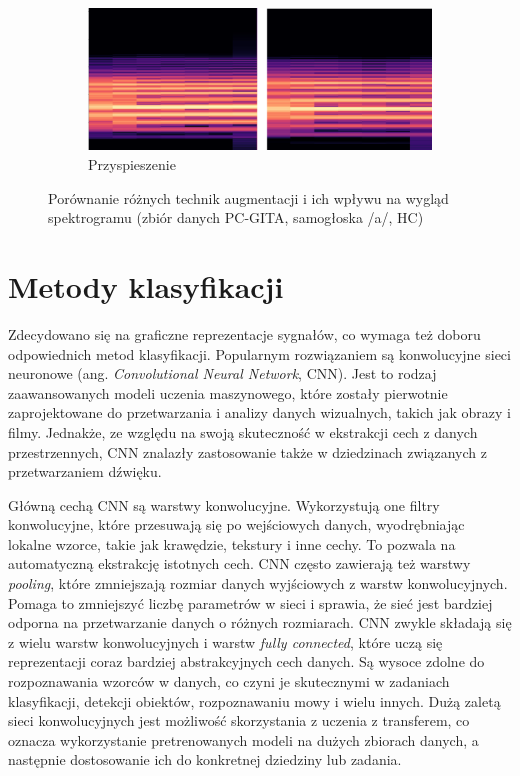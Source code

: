 \begin{figure}[ht]
    \begin{subfigure}{0.7\textwidth}
        \includegraphics[width=\linewidth]{./img/augmentation/speed}
        \caption{Przyspieszenie\@}
        \label{fig:speed}
    \end{subfigure}

    \caption{Porównanie różnych technik augmentacji i ich wpływu na wygląd spektrogramu (zbiór danych PC-GITA, samogłoska /a/, HC)}
    \label{fig:augumentacja}
\end{figure}

\section{Metody klasyfikacji}
\label{sec:klasyfikacja}

Zdecydowano się na graficzne reprezentacje sygnałów, co wymaga też doboru odpowiednich metod klasyfikacji.
Popularnym rozwiązaniem są konwolucyjne sieci neuronowe (ang. \emph{Convolutional Neural Network}, CNN).
Jest to rodzaj zaawansowanych modeli uczenia maszynowego, które zostały pierwotnie zaprojektowane do przetwarzania i analizy danych wizualnych, takich jak obrazy i filmy.
Jednakże, ze względu na swoją skuteczność w ekstrakcji cech z danych przestrzennych, CNN znalazły zastosowanie także w dziedzinach związanych z przetwarzaniem dźwięku.

Główną cechą CNN są warstwy konwolucyjne.
Wykorzystują one filtry konwolucyjne, które przesuwają się po wejściowych danych, wyodrębniając lokalne wzorce, takie jak krawędzie, tekstury i inne cechy.
To pozwala na automatyczną ekstrakcję istotnych cech.
CNN często zawierają też warstwy \emph{pooling}, które zmniejszają rozmiar danych wyjściowych z warstw konwolucyjnych.
Pomaga to zmniejszyć liczbę parametrów w sieci i sprawia, że sieć jest bardziej odporna na przetwarzanie danych o różnych rozmiarach.
CNN zwykle składają się z wielu warstw konwolucyjnych i warstw \emph{fully connected}, które uczą się reprezentacji coraz bardziej abstrakcyjnych cech danych.
Są wysoce zdolne do rozpoznawania wzorców w danych, co czyni je skutecznymi w zadaniach klasyfikacji, detekcji obiektów, rozpoznawaniu mowy i wielu innych.
Dużą zaletą sieci konwolucyjnych jest możliwość skorzystania z uczenia z transferem, co oznacza wykorzystanie pretrenowanych modeli na dużych zbiorach danych, a następnie dostosowanie ich do konkretnej dziedziny lub zadania.

